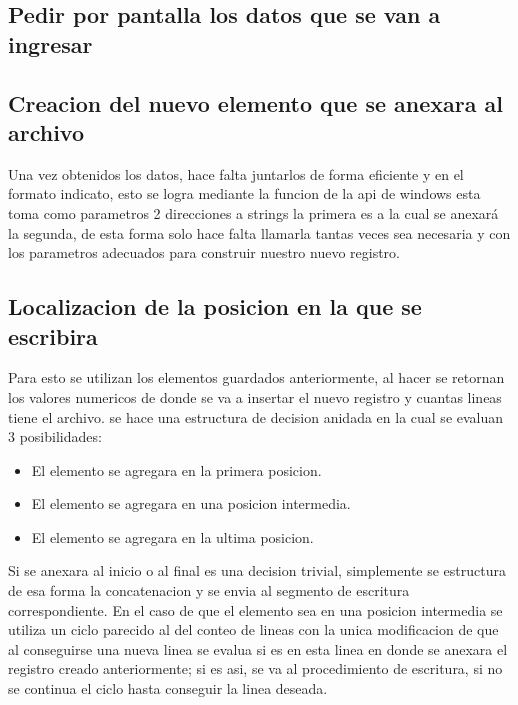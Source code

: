 \subsection*{Pedir por pantalla los datos que se van a ingresar}


\subsection*{ Creacion del nuevo elemento que se anexara al archivo}
    Una vez obtenidos los datos, hace falta juntarlos de forma eficiente y en el
    formato indicato, esto se logra mediante la funcion de la api de windows
     esta toma como parametros 2 direcciones a strings
    la primera es a la cual se anexará la segunda, de esta forma solo hace falta
    llamarla tantas veces sea necesaria y con los parametros adecuados para
    construir nuestro nuevo registro.

\subsection*{Localizacion de la posicion en la que se escribira}

    Para esto se utilizan los elementos guardados anteriormente, al hacer
     se retornan los valores numericos de donde se va a insertar
    el nuevo registro y cuantas lineas tiene el archivo. se hace una estructura
    de decision anidada en la cual se evaluan 3 posibilidades:

    \begin{itemize}
        \item El elemento se agregara en la primera posicion.
        \item El elemento se agregara en una posicion intermedia.
        \item El elemento se agregara en la ultima posicion.
    \end{itemize}

    Si se anexara al inicio o al final es una decision trivial, simplemente se
    estructura de esa forma la concatenacion y se envia al segmento de escritura
    correspondiente. En el caso de que el elemento sea
    en una posicion intermedia se utiliza un ciclo parecido al del conteo de lineas
    con la unica modificacion de que al conseguirse una nueva linea se evalua si
    es en esta linea en donde se anexara el registro creado anteriormente; si es
    asi, se va al procedimiento de escritura, si no se continua el ciclo hasta
    conseguir la linea deseada.


